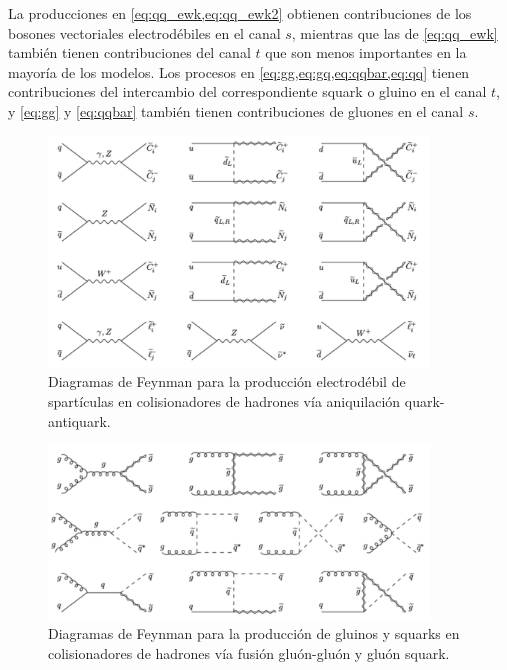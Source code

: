 La producciones en \cref{eq:qq_ewk,eq:qq_ewk2} obtienen contribuciones de los
bosones vectoriales electrodébiles en el canal $s$, mientras que las de
\cref{eq:qq_ewk} también tienen contribuciones del canal $t$ que son menos
importantes en la mayoría de los modelos. Los procesos en
\cref{eq:gg,eq:gq,eq:qqbar,eq:qq} tienen contribuciones del intercambio del
correspondiente squark o gluino en el canal $t$, y \cref{eq:gg} y
\cref{eq:qqbar} también tienen contribuciones de gluones en el canal $s$.

\begin{figure}[h]
  \centering \includegraphics[width=0.9\textwidth]{figures/figure_101}
  \caption{Diagramas de Feynman para la producción electrodébil de spartículas
    en colisionadores de hadrones vía aniquilación quark-antiquark.}
  \label{fig:ewkprod}
\end{figure}

\begin{figure}[h]
  \centering \includegraphics[width=0.9\textwidth]{figures/figure_102}
  \caption{Diagramas de Feynman para la producción de gluinos y squarks en
    colisionadores de hadrones vía fusión gluón-gluón y gluón squark.}
  \label{fig:strongprod1}
\end{figure}

